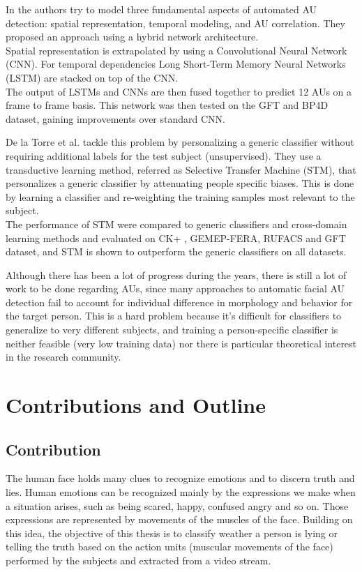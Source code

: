 In \cite{AU_LSTM} the authors try to model three fundamental aspects of automated AU detection: spatial representation, temporal modeling, and AU correlation. They proposed an approach using a hybrid network architecture. \\
Spatial representation is extrapolated by using a Convolutional Neural Network (CNN). For temporal dependencies Long Short-Term Memory Neural Networks (LSTM) are stacked on top of the CNN. \\
The output of LSTMs and CNNs are then fused together to predict 12 AUs on a frame to frame basis. This network was then tested on the GFT and BP4D \cite{BP4D-Spontaneous} dataset, gaining improvements over standard CNN.

De la Torre et al. \cite{AU_STM} \cite{AU_STM2} tackle this problem by personalizing a generic classifier without requiring additional labels for the test subject (unsupervised). They use a transductive learning method, referred as Selective Transfer Machine (STM), that personalizes a generic classifier by attenuating people specific biases. This is done by  learning a classifier and re-weighting the training samples most relevant to the subject. \\
The performance of STM were compared to generic classifiers and cross-domain learning methods and evaluated on CK+ \cite{CK+}, GEMEP-FERA, RUFACS and GFT dataset, and STM is shown to outperform the generic classifiers on all datasets.

Although there has been a lot of progress during the years, there is still a lot of work to be done regarding AUs, since many approaches to automatic facial AU detection fail to account for individual difference in morphology and behavior for the target person. This is a hard problem because it's difficult for classifiers to generalize to very different subjects, and training a person-specific classifier is neither feasible (very low training data) nor there is particular theoretical interest in the research community. 

\clearpage

\section{Contributions and Outline} \label{contrib}

\subsection{Contribution}
The human face holds many clues to recognize emotions and to discern truth and lies. Human emotions can be recognized mainly by the expressions we make when a situation arises, such as being scared, happy, confused angry and so on. Those expressions are represented by movements of the muscles of the face. Building on this idea, the objective of this thesis is to classify weather a person is lying or telling the truth based on the action units (muscular movements of the face) performed by the subjects and extracted from a video stream. 

